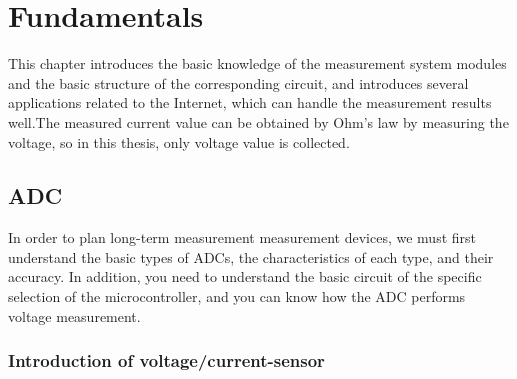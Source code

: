 \chapter{Fundamentals}
\label{chap:Fundamentals}
This chapter introduces the basic knowledge of the measurement system modules and the basic structure of the corresponding circuit, and introduces several applications related to the Internet, which can handle the measurement results well.The measured current value can be obtained by Ohm's law by measuring the voltage, so in this thesis, only voltage value is collected.
\section{ADC}
\label{sec:ADC}
In order to plan long-term measurement measurement devices, we must first understand the basic types of ADCs, the characteristics of each type, and their accuracy. In addition, you need to understand the basic circuit of the specific selection of the microcontroller, and you can know how the ADC performs voltage measurement.

\subsection{Introduction of voltage/current-sensor}
\label{sec:Introduction of voltage/current-sensor}


